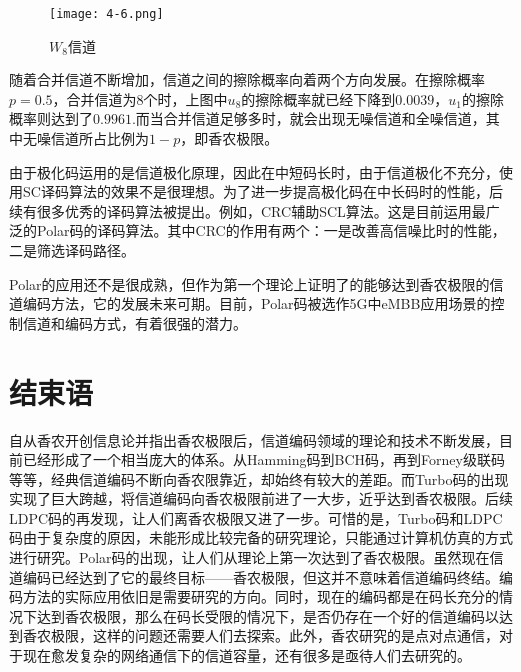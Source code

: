 \documentclass{article}
\begin{document}
\begin{figure}[h]
  \centering
  \texttt{[image: 4-6.png]}
  \caption{$W_8$信道}
\end{figure}

随着合并信道不断增加，信道之间的擦除概率向着两个方向发展。在擦除概率$p=0.5$，合并信道为8个时，上图中$u_8$的擦除概率就已经下降到$0.0039$，$u_1$的擦除概率则达到了$0.9961$.而当合并信道足够多时，就会出现无噪信道和全噪信道，其中无噪信道所占比例为$1-p$，即香农极限。\cite{arikan2009channel}

由于极化码运用的是信道极化原理，因此在中短码长时，由于信道极化不充分，使用SC译码算法的效果不是很理想。为了进一步提高极化码在中长码时的性能，后续有很多优秀的译码算法被提出。例如，CRC辅助SCL算法。\cite{tal2015listdecoding}这是目前运用最广泛的Polar码的译码算法。其中CRC的作用有两个：一是改善高信噪比时的性能，二是筛选译码路径。

Polar的应用还不是很成熟，但作为第一个理论上证明了的能够达到香农极限的信道编码方法，它的发展未来可期。目前，Polar码被选作5G中eMBB应用场景的控制信道和编码方式，有着很强的潜力。


\section{结束语}
自从香农开创信息论并指出香农极限后，信道编码领域的理论和技术不断发展，目前已经形成了一个相当庞大的体系。从Hamming码到BCH码，再到Forney级联码等等，经典信道编码不断向香农限靠近，却始终有较大的差距。而Turbo码的出现实现了巨大跨越，将信道编码向香农极限前进了一大步，近乎达到香农极限。后续LDPC码的再发现，让人们离香农极限又进了一步。可惜的是，Turbo码和LDPC码由于复杂度的原因，未能形成比较完备的研究理论，只能通过计算机仿真的方式进行研究。Polar码的出现，让人们从理论上第一次达到了香农极限。虽然现在信道编码已经达到了它的最终目标——香农极限，但这并不意味着信道编码终结。编码方法的实际应用依旧是需要研究的方向。同时，现在的编码都是在码长充分的情况下达到香农极限，那么在码长受限的情况下，是否仍存在一个好的信道编码以达到香农极限，这样的问题还需要人们去探索。此外，香农研究的是点对点通信，对于现在愈发复杂的网络通信下的信道容量，还有很多是亟待人们去研究的。
\end{document}
